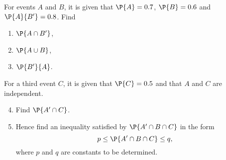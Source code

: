\begin{problem}
    For events $A$ and $B$, it is given that $\P{A} = 0.7$, $\P{B} = 0.6$ and $\P{A}{B'} = 0.8$. Find
    \begin{enumerate}
        \item $\P{A \cap B'}$,
        \item $\P{A \cup B}$,
        \item $\P{B'}{A}$.
    \end{enumerate}
    For a third event $C$, it is given that $\P{C} = 0.5$ and that $A$ and $C$ are independent.
    \begin{enumerate}
        \setcounter{enumi}{3}
        \item Find $\P{A' \cap C}$.
        \item Hence find an inequality satisfied by $\P{A' \cap B \cap C}$ in the form \[p \leq \P{A' \cap B \cap C} \leq q,\] where $p$ and $q$ are constants to be determined.
    \end{enumerate}
\end{problem}
\clearpage
